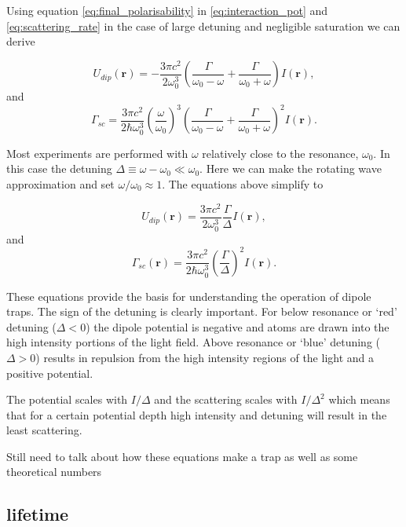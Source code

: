 Using equation \ref{eq:final_polarisability} in \ref{eq:interaction_pot} and \ref{eq:scattering_rate} in the case of large detuning and negligible saturation we can derive

\begin{equation}\label{eq:potential}
U_{dip}(\boldsymbol r) = -\frac{3\pi c^2}{2\omega_0^3}\left(\frac{\Gamma}{\omega_0-\omega} + \frac{\Gamma}{\omega_0+\omega}\right) I(\boldsymbol r),
\end{equation}
and
\begin{equation}\label{eq:scattering}
\Gamma_{sc} = \frac{3\pi c^2}{2\hbar\omega_0^3} \left(\frac{\omega}{\omega_0}\right)^3 \left(\frac{\Gamma}{\omega_0 - \omega} + \frac{\Gamma}{\omega_0+\omega}\right)^2 I(\boldsymbol r).
\end{equation}

Most experiments are performed with $\omega$ relatively close to the resonance, $\omega_0$. In this case the detuning $\Delta\equiv \omega - \omega_0 \ll \omega_0$. Here we can make the rotating wave approximation and set $\omega/\omega_0\approx 1$. The equations above simplify to

\begin{equation}\label{eq:simple_potential}
U_{dip}(\boldsymbol{r}) = \frac{3\pi c^2}{2 \omega_0^3} \frac{\Gamma}{\Delta} I(\boldsymbol{r}),
\end{equation}
and
\begin{equation}\label{eq:simple_scattering}
\Gamma_{sc} (\boldsymbol r ) = \frac{3\pi c^2}{2\hbar\omega_0^3} \left( \frac{\Gamma}{\Delta} \right)^2 I(\boldsymbol r ).
\end{equation}

These equations provide the basis for understanding the operation of dipole traps. The sign of the detuning is clearly important. For below resonance or `red' detuning ($\Delta < 0$) the dipole potential is negative and atoms are drawn into the high intensity portions of the light field. Above resonance or `blue' detuning ($\Delta > 0$) results in repulsion from the high intensity regions of the light and a positive potential.

The potential scales with $I/\Delta$ and the scattering scales with $I/\Delta^2$ which means that for a certain potential depth high intensity and detuning will result in the least scattering.

{\color{red} Still need to talk about how these equations make a trap as well as some theoretical numbers}

\subsection{lifetime}

